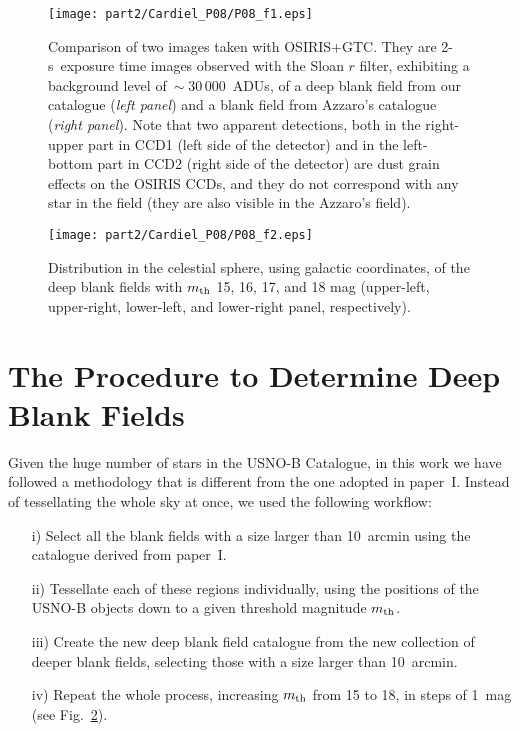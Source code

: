 \begin{figure}
\centerline{%
\texttt{[image: part2/Cardiel\_P08/P08\_f1.eps]}}
\caption{Comparison of two images taken with OSIRIS+GTC. They are \mbox{2-s exposure} time images observed with the Sloan $r$ filter, exhibiting a background level of$~\sim 30\,000$~ADUs, of a deep blank field from our catalogue (\emph{left panel}) and a blank field from Azzaro's catalogue (\emph{right panel}). Note that two apparent detections, both in the right-upper part in CCD1 (left side of the detector) and in the left-bottom part in CCD2 (right side of the detector) are dust grain effects on the OSIRIS CCDs, and they do not correspond with any star in the field (they are also visible in the Azzaro's field).}
\label{example_DBF}
\end{figure}

\begin{figure}
\centerline{%
\texttt{[image: part2/Cardiel\_P08/P08\_f2.eps]}}
\caption{Distribution in the celestial sphere, using galactic coordinates, of the deep blank fields with $m_{\mbox{\scriptsize th}}$ 15, 16, 17, and 18 mag (upper-left, upper-right, lower-left, and lower-right panel, respectively).}
\label{result_DBF}
\end{figure}


\section{The Procedure to Determine Deep Blank Fields}

Given the huge number of stars in the USNO-B Catalogue, in this work we have followed a methodology that is different from the one adopted in paper~I. Instead of tessellating the whole sky at once, we used the following workflow:
\begin{itemize}
  \item[i)] Select all the blank fields with a size larger than 10~arcmin using
  the catalogue derived from paper~I.
  \item[ii)] Tessellate each of these regions individually, using the positions
  of the USNO-B objects down to a given threshold magnitude
  $m_{\mbox{\scriptsize th}}$.
  \item[iii)] Create the new deep blank field catalogue from the new collection
  of deeper blank fields, selecting those with a size larger than 10~arcmin.
  \item[iv)] Repeat the whole process, increasing 
  $m_{\mbox{\scriptsize th}}$ from 15 to 18, in steps of 1~mag (see
  Fig.~\ref{result_DBF}).
\end{itemize}

